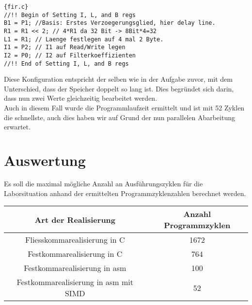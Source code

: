 \begin{adjustbox}{width=\textwidth,height=\textheight,keepaspectratio}
 \begin{lstlisting}[title=fir.c]{fir.c}
//!! Begin of Setting I, L, and B regs	
B1 = P1; //Basis: Erstes Verzoegerungsglied, hier delay line.
R1 = R1 << 2; // 4*R1 da 32 Bit -> 8Bit*4=32
L1 = R1; // Laenge festlegen auf 4 mal 2 Byte.
I1 = P2; // I1 auf Read/Write legen
I2 = P0; // I2 auf Filterkoeffizienten
//!! End of Setting I, L, and B regs
\end{lstlisting}
\end{adjustbox}
Diese Konfiguration entspricht der selben wie in der Aufgabe zuvor, mit dem Unterschied, dass der Speicher doppelt so lang ist. Dies begr\"undet sich darin, dass nun zwei Werte gleichzeitig bearbeitet werden.\\
Auch in diesem Fall wurde die Programmlaufzeit ermittelt und ist mit 52 Zyklen die schnellste, auch dies haben wir auf Grund der nun parallelen Abarbeitung erwartet.



\section{Auswertung}
Es soll die maximal m\"ogliche Anzahl an Ausf\"uhrungszyklen für die Laborsituation anhand der ermittelten Programmzyklenzahlen berechnet werden.\\
\begin{center}
\begin{tabular}{|c|c|}
\hline 
Art der Realisierung & Anzahl Programmzyklen \\ 
\hline 
Fliesskommarealisierung in C & 1672 \\ 
\hline 
Festkommarealisierung in C & 764 \\ 
\hline 
Festkommarealisierung in asm & 100 \\ 
\hline 
Festkommarealisierung in asm mit SIMD & 52 \\ 
\hline 
\end{tabular} 
\end{center}

